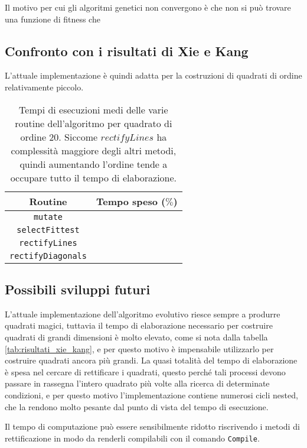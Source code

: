 \documentclass[italian,twoside,twocolumn]{article}
\begin{document}
Il motivo per cui gli algoritmi genetici non convergono è che non si può trovare una funzione di fitness che 

\subsection{Confronto con i risultati di Xie e Kang}

L'attuale implementazione è quindi adatta per la costruzioni di quadrati di ordine relativamente piccolo.

\begin{table}
	\centering
	\caption{Tempi di esecuzioni medi delle varie routine dell'algoritmo per quadrato di ordine 20. Siccome $ rectifyLines $ ha complessità maggiore degli altri metodi, quindi aumentando l'ordine tende a occupare tutto il tempo di elaborazione.}
\begin{tabular}{cc}
	\hline
	         Routine          & Tempo speso ($ \si{\percent} $)\\ \hline
	     \texttt{mutate}      &  \\ 
	 \texttt{selectFittest}   &  \\ 
	  \texttt{rectifyLines}   &  \\ 
	\texttt{rectifyDiagonals} &  \\ \hline
\end{tabular} 
	\label{tab:tempi_gentic}
\end{table}

\subsection{Possibili sviluppi futuri}
L'attuale implementazione dell'algoritmo evolutivo riesce sempre a produrre quadrati magici, tuttavia il tempo di elaborazione necessario per costruire quadrati di grandi dimensioni è molto elevato, come si nota dalla tabella \ref{tab:risultati_xie_kang}, e per questo motivo è impensabile utilizzarlo per costruire quadrati ancora più grandi. La quasi totalità del tempo di elaborazione è spesa nel cercare di rettificare i quadrati, questo perché tali processi devono passare in rassegna l'intero quadrato più volte alla ricerca di determinate condizioni, e per questo motivo l'implementazione contiene numerosi cicli nested, che la rendono molto pesante dal punto di vista del tempo di esecuzione.

Il tempo di computazione può essere sensibilmente ridotto riscrivendo i metodi di rettificazione in modo da renderli compilabili con il comando \texttt{Compile}.
\end{document}
